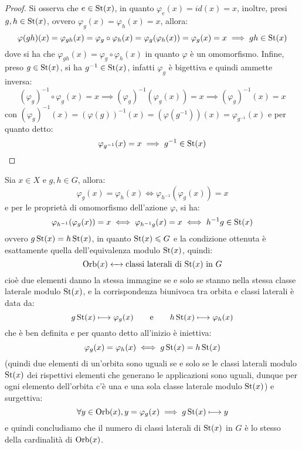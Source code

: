 \documentclass[11pt]{scrartcl}
\begin{document}
\begin{proof}
    Si osserva che $e \in \operatorname{St}(x)$, in quanto $\varphi_e(x) = id(x) = x$, inoltre, presi $g,h \in \operatorname{St}(x)$, ovvero $\varphi_g (x) = \varphi_h(x) = x$, allora:
        \[ \varphi(gh)(x) = \varphi_{gh}(x) = \varphi_g \circ \varphi_h (x) = \varphi_g(\varphi_h(x)) = \varphi_g(x) = x \implies gh \in \operatorname{St}(x)
            \]
    dove si ha che $ \varphi_{gh}(x) = \varphi_g \circ \varphi_h (x)$ in quanto $\varphi$ è un omomorfismo.
    Infine, preso $g \in \operatorname{St}(x)$, si ha $g^{-1} \in \operatorname{St}(x)$, infatti $\varphi_g$ è bigettiva e quindi ammette inversa:
        \[ (\varphi_g)^{-1} \circ \varphi_g (x) = x \implies (\varphi_g)^{-1}(\varphi_g(x)) = x \implies (\varphi_g)^{-1}(x) = x
            \]
    con $(\varphi_g)^{-1}(x) = (\varphi(g))^{-1}(x) = (\varphi(g^{-1}))(x) = \varphi_{g^{-1}}(x)$ e per quanto detto:
        \[ \varphi_{g^{-1}} (x) = x \implies g^{-1} \in \operatorname{St}(x)
            \]
\end{proof}

\pagebreak
\begin{remark}
    Sia $x \in X$ e $g,h \in G$, allora:
        \[ \varphi_g(x) = \varphi_h(x) \iff \varphi_{h^{-1}}(\varphi_g(x)) = x
            \]
    e per le proprietà di omomorfismo dell'azione $\varphi$, si ha:
        \[ \varphi_{h^{-1}}(\varphi_g(x)) = x \iff \varphi_{h^{-1}g}(x) = x \iff h^{-1}g \in \operatorname{St}(x)
            \]
    ovvero $g \operatorname{St}(x) = h \operatorname{St}(x)$, in quanto $\operatorname{St}(x) \leqslant G$ e la condizione ottenuta è esattamente quella dell'equivalenza modulo $\operatorname{St}(x)$,
    quindi:
    \[ \operatorname{Orb}(x) \leftarrow\mathrel{\mkern-7mu}\rightarrow \text{classi laterali di $\operatorname{St}(x)$ in $G$}
        \]
    cioè due elementi danno la stessa immagine se e solo se stanno nella stessa classe laterale modulo $\operatorname{St}(x)$, e la corrispondenza biunivoca tra orbita e classi
    laterali è data da:
    \[ g\operatorname{St}(x) \longmapsto \varphi_g(x) \qquad \text e \qquad h\operatorname{St}(x) \longmapsto \varphi_h(x)
                \]
    che è ben definita e per quanto detto all'inizio è iniettiva:
        \[ \varphi_g(x) = \varphi_h(x) \iff g\operatorname{St}(x) = h\operatorname{St}(x)
            \]
    (quindi due elementi di un'orbita sono uguali se e solo se le classi laterali modulo $\operatorname{St}(x)$ dei rispettivi elementi che generano le applicazioni sono uguali, dunque per ogni elemento
    dell'orbita c'è una e una sola classe laterale modulo $\operatorname{St}(x)$) e surgettiva:
        \[ \forall y \in \operatorname{Orb}(x), y = \varphi_g(x) \implies g\operatorname{St}(x) \longmapsto y
            \]
    e quindi concludiamo che il numero di classi laterali di $\operatorname{St}(x)$ in $G$ è lo stesso della cardinalità di $\operatorname{Orb}(x)$.
\end{remark}
\end{document}
